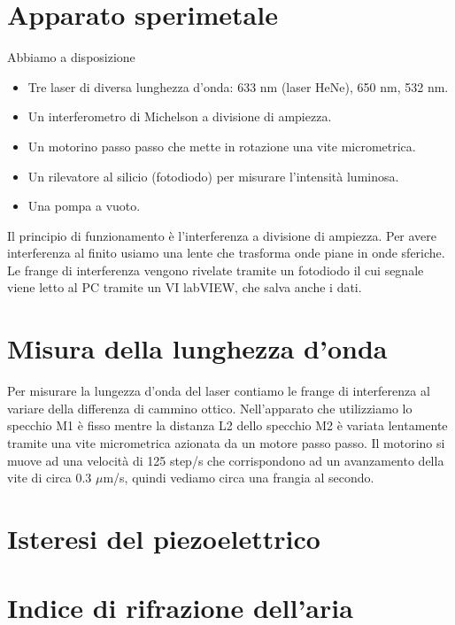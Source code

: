 \documentclass[a4paper]{article}
\begin{document}
\section{Apparato sperimetale}

	Abbiamo a disposizione 
	\begin{itemize}
		\item Tre laser di diversa lunghezza d'onda: 633 nm (laser HeNe), 650 nm, 532 nm.
		\item Un interferometro di Michelson a divisione di ampiezza.
		\item Un motorino passo passo che mette in rotazione una vite micrometrica.
		\item Un rilevatore al silicio (fotodiodo) per misurare l'intensità luminosa.
		\item Una pompa a vuoto.
	\end{itemize}
Il principio di funzionamento è l'interferenza a divisione di ampiezza. Per avere interferenza al finito usiamo una lente che trasforma onde piane in onde sferiche. Le frange di interferenza vengono rivelate tramite un fotodiodo il cui segnale viene letto al PC tramite un VI labVIEW, che salva anche i dati.

\section{Misura della lunghezza d'onda}
Per misurare la lungezza d'onda del laser contiamo le frange di interferenza al variare della differenza di cammino ottico. Nell'apparato che utilizziamo lo specchio M1 è fisso mentre la distanza L2 dello specchio M2 è variata lentamente tramite una vite micrometrica azionata da un motore passo passo.
Il motorino si muove ad una velocità di 125 step/s che corrispondono ad un avanzamento della vite di circa 0.3 $\mu$m/s, quindi vediamo circa una frangia al secondo.

\section{Isteresi del piezoelettrico}

\section{Indice di rifrazione dell'aria}
\end{document}
